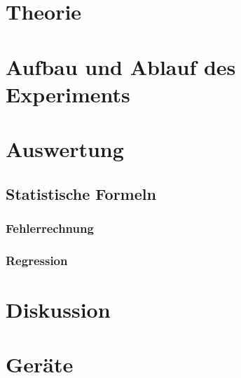 \documentclass[a4,12pt]{article}
\begin{document}



\tableofcontents
\newpage


\section{Theorie}

\newpage


\section{Aufbau und Ablauf des Experiments}

\clearpage


\section{Auswertung}
\subsection{Statistische Formeln}
\subsubsection{Fehlerrechnung}
\label{sec:Fehlerrechnung}

\subsubsection{Regression}
\label{sec:regression}

\clearpage

\clearpage


\section{Diskussion}



\section{Geräte}

\end{document}
